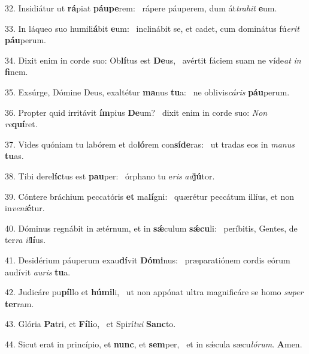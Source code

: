32. Insidiátur ut \textbf{rá}piat \textbf{páu}\textbf{pe}rem: \ast\  rápere páuperem, dum át\textit{tra}\textit{hit} \textbf{e}um.\

33. In láqueo suo humili\textbf{á}bit \textbf{e}um: \ast\  inclinábit se, et cadet, cum dominátus fú\textit{e}\textit{rit} \textbf{páu}perum.\

34. Dixit enim in corde suo: Ob\textbf{lí}tus est \textbf{De}us, \ast\  avértit fáciem suam ne víde\textit{at} \textit{in} \textbf{fi}nem.\

35. Exsúrge, Dómine Deus, exaltétur \textbf{ma}nus \textbf{tu}a: \ast\  ne oblivis\textit{cá}\textit{ris} \textbf{páu}perum.\

36. Propter quid irritávit \textbf{ím}pius \textbf{De}um? \ast\  dixit enim in corde suo: \textit{Non} \textit{re}\textbf{quí}ret.\

37. Vides quóniam tu labórem et do\textbf{ló}rem con\textbf{sí}\textbf{de}ras: \ast\  ut tradas eos in \textit{ma}\textit{nus} \textbf{tu}as.\

38. Tibi dere\textbf{líc}tus est \textbf{pau}per: \ast\  órphano tu e\textit{ris} \textit{ad}\textbf{jú}tor.\

39. Cóntere bráchium peccatóris \textbf{et} ma\textbf{lí}gni: \ast\  quærétur peccátum illíus, et non in\textit{ve}\textit{ni}\textbf{é}tur.\

40. Dóminus regnábit in ætérnum, et in \textbf{sǽ}culum \textbf{sǽ}\textbf{cu}li: \ast\  períbitis, Gentes, de ter\textit{ra} \textit{il}\textbf{lí}us.\

41. Desidérium páuperum exau\textbf{dí}vit \textbf{Dó}\textbf{mi}nus: \ast\  præparatiónem cordis eórum audívit \textit{au}\textit{ris} \textbf{tu}a.\

42. Judicáre pu\textbf{píl}lo et \textbf{hú}\textbf{mi}li, \ast\  ut non appónat ultra magnificáre se homo \textit{su}\textit{per} \textbf{ter}ram.\

43. Glória \textbf{Pa}tri, et \textbf{Fí}\textbf{li}o, \ast\  et Spirí\textit{tu}\textit{i} \textbf{Sanc}to.\

44. Sicut erat in princípio, et \textbf{nunc}, et \textbf{sem}per, \ast\  et in sǽcula sæcu\textit{ló}\textit{rum}. \textbf{A}men.\

